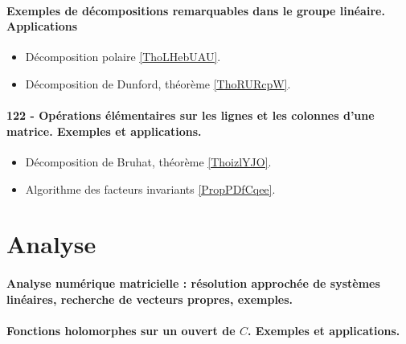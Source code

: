 \paragraph{Exemples de décompositions remarquables dans le groupe linéaire. Applications}
\begin{itemize}
    \item Décomposition polaire \ref{ThoLHebUAU}.
    \item Décomposition de Dunford, théorème \ref{ThoRURcpW}. 
\end{itemize}

\paragraph{122 - Opérations élémentaires sur les lignes et les colonnes d’une matrice. Exemples et applications.}
\begin{itemize}
    \item Décomposition de Bruhat, théorème \ref{ThoizlYJO}.
    \item Algorithme des facteurs invariants \ref{PropPDfCqee}.
\end{itemize}

\section{Analyse}


\paragraph{Analyse numérique matricielle : résolution approchée de systèmes linéaires, recherche de vecteurs propres, exemples.}
\paragraph{Fonctions holomorphes sur un ouvert de $C$. Exemples et applications.}

